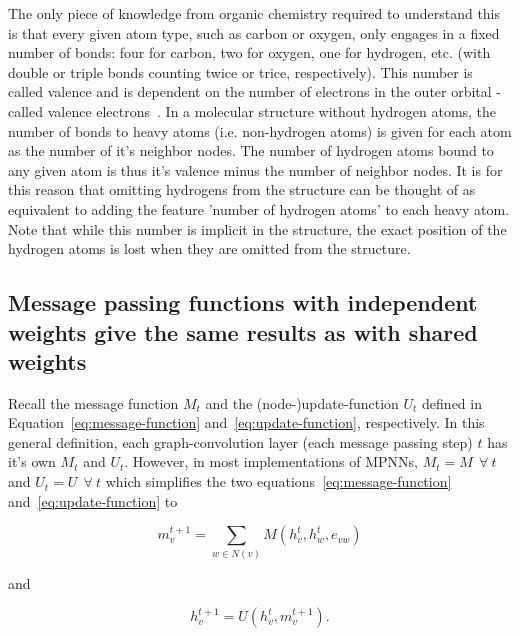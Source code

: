 The only piece of knowledge from organic chemistry required to understand this is that every given atom type, such as carbon or oxygen, only engages in a fixed number of bonds: four for carbon, two for oxygen, one for hydrogen, etc. (with double or triple bonds counting twice or trice, respectively). This number is called valence and is dependent on the number of electrons in the outer orbital - called valence electrons~\cite{Organic-chemistry}. In a molecular structure without hydrogen atoms, the number of bonds to heavy atoms (i.e. non-hydrogen atoms) is given for each atom as the number of it's neighbor nodes. The number of hydrogen atoms bound to any given atom is thus it's valence minus the number of neighbor nodes. It is for this reason that omitting hydrogens from the structure can be thought of as equivalent to adding the feature 'number of hydrogen atoms' to each heavy atom. Note that while this number is implicit in the structure, the exact position of the hydrogen atoms is lost when they are omitted from the structure.



\subsection{Message passing functions with independent weights give the same results as with shared weights}
\label{sec:weight-sharing}

Recall the message function $M_t$ and the (node-)update-function $U_t$ defined in Equation~\ref{eq:message-function} and~\ref{eq:update-function}, respectively. In this general definition, each graph-convolution layer (each message passing step) $t$ has it's own $M_t$ and $U_t$. However, in most implementations of MPNNs, $M_t = M~~\forall~t$ and $U_t = U~~\forall~t$ which simplifies the two equations~\ref{eq:message-function} and~\ref{eq:update-function} to

\begin{equation}\label{eq:message-function-shared}
m_v^{t+1} = \sum_{w \in N(v)} M(h_v^t, h_w^t, e_{vw})
\end{equation}

and

\begin{equation}\label{eq:update-function-shared}
h_v^{t+1} = U(h_v^t, m_v^{t+1}).
\end{equation}

